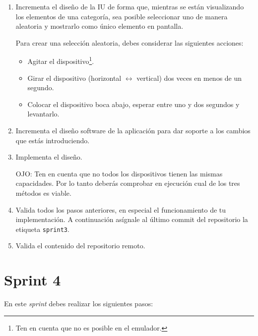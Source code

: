 \documentclass[11pt,a4paper]{article}
\begin{document}
\begin{enumerate}
\item Incrementa el diseño de la IU de forma que, mientras se están
  visualizando los elementos de una categoría, sea posible seleccionar
  uno de manera aleatoria y mostrarlo como único elemento en pantalla.

  Para crear una selección aleatoria, debes considerar las siguientes
  acciones:

  \begin{itemize}
  \item Agitar el dispositivo\footnote{Ten en cuenta que no es posible
      en el emulador.}.
  \item Girar el dispositivo (horizontal $\leftrightarrow$ vertical) dos
    veces en menos de un segundo.
  \item Colocar el dispositivo boca abajo, esperar entre uno y dos
    segundos y levantarlo.
  \end{itemize}

\item Incrementa el diseño software de la aplicación para dar soporte
  a los cambios que estás introduciendo.

\item Implementa el diseño.

  OJO: Ten en cuenta que no todos los dispositivos tienen las mismas
  capacidades. Por lo tanto deberás comprobar en ejecución cual de los
  tres métodos es viable.

\item Valida todos los pasos anteriores, en especial el funcionamiento
  de tu implementación. A continuación asígnale al último commit del
  repositorio la etiqueta \texttt{sprint3}.

\item Valida el contenido del repositorio remoto.
\end{enumerate}



\section{Sprint 4}


En este \emph{sprint} debes realizar los siguientes pasos:
\end{document}
